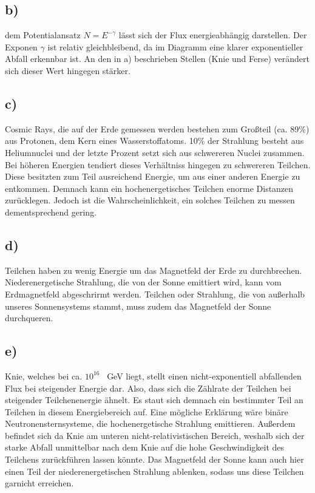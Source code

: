 \subsection{b)}

    \justifying dem Potentialansatz $N=E^{-\gamma}$ lässt sich der Flux energieabhängig darstellen. Der Exponen $\gamma$ ist relativ gleichbleibend, da im Diagramm
    eine klarer exponentieller Abfall erkennbar ist. An den in a) beschrieben Stellen (Knie und Ferse) verändert sich dieser Wert hingegen stärker.

\subsection{c)}

    \justifying Cosmic Rays, die auf der Erde gemessen werden bestehen zum Großteil (ca. 89\%) aus Protonen, dem Kern eines Wasserstoffatoms. 10\% der Strahlung 
    besteht aus Heliumnuclei und der letzte Prozent setzt sich aus schwereren Nuclei zusammen. 
    Bei höheren Energien tendiert dieses Verhältniss hingegen zu schwereren Teilchen. Diese besitzten zum Teil ausreichend Energie, um aus einer anderen Energie zu entkommen. Demnach 
    kann ein hochenergetisches Teilchen enorme Distanzen zurücklegen. Jedoch ist die Wahrscheinlichkeit, ein solches Teilchen zu messen dementsprechend gering. 

\subsection{d)}

    \justifying Teilchen haben zu wenig Energie um das Magnetfeld der Erde zu durchbrechen. Niederenergetische Strahlung, die von der Sonne emittiert 
    wird, kann vom Erdmagnetfeld abgeschrirmt werden. Teilchen oder Strahlung, die von außerhalb unseres Sonnensystems stammt, muss zudem das Magnetfeld der Sonne durchqueren. 

\subsection{e)}

    \justifying Knie, welches bei ca. $10^{16}$ \SI{}{\giga\electronvolt} liegt, stellt einen nicht-exponentiell abfallenden Flux bei steigender Energie dar. Also, dass 
    sich die Zählrate der Teilchen bei steigender Teilchenenergie ähnelt. Es staut sich demnach ein bestimmter Teil an Teilchen in diesem Energiebereich auf. Eine mögliche Erklärung
    wäre binäre Neutronensternsysteme, die hochenergetische Strahlung emittieren. Außerdem befindet sich da Knie am unteren nicht-relativistischen Bereich, weshalb sich der starke
    Abfall unmittelbar nach dem Knie auf die hohe Geschwindigkeit des Teilchens zurückführen lassen könnte. Das Magnetfeld der Sonne kann auch hier einen Teil der niederenergetischen
    Strahlung ablenken, sodass uns diese Teilchen garnicht erreichen. 

